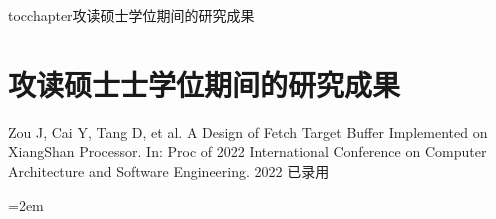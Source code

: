 
\newenvironment{thepublications}{\wuhao\song}

\addcontentsline{toc}{chapter}{攻读硕士学位期间的研究成果}%
\chapter*{\centering\xiaosan\hei\bfseries 攻读硕士士学位期间的研究成果}

\begin{thepublications}

\setlength{\parindent}{0em}
\begin{publist}
	\item Zou J, Cai Y, Tang D, et al. A Design of Fetch Target Buffer Implemented on XiangShan Processor. In: Proc of 2022 International Conference on Computer Architecture and Software Engineering. 2022 已录用
\end{publist}

\vfill
{}\hangindent=2em\noindent

\setlength{\parindent}{2em}

\end{thepublications}

